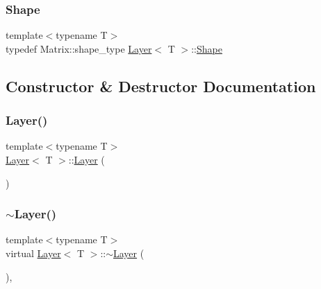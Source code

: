 \mbox{\label{class_layer_a8313f42d2292d12dd5d40cc115636693}} 
\subsubsection{\texorpdfstring{Shape}{Shape}}
{\footnotesize\ttfamily template$<$typename T$>$ \\
typedef Matrix\+::shape\+\_\+type \mbox{\hyperlink{class_layer}{Layer}}$<$ T $>$\+::\mbox{\hyperlink{class_layer_a8313f42d2292d12dd5d40cc115636693}{Shape}}}



\subsection{Constructor \& Destructor Documentation}
\mbox{\label{class_layer_a7db1fc76bec3431efbb0984192e2ae23}} 
\subsubsection{\texorpdfstring{Layer()}{Layer()}}
{\footnotesize\ttfamily template$<$typename T$>$ \\
\mbox{\hyperlink{class_layer}{Layer}}$<$ T $>$\+::\mbox{\hyperlink{class_layer}{Layer}} (\begin{DoxyParamCaption}{ }\end{DoxyParamCaption})\hspace{0.3cm}{\ttfamily [default]}}

\mbox{\label{class_layer_ac2c7d2238eb3d09a2198736c5b10f940}} 
\subsubsection{\texorpdfstring{$\sim$Layer()}{~Layer()}}
{\footnotesize\ttfamily template$<$typename T$>$ \\
virtual \mbox{\hyperlink{class_layer}{Layer}}$<$ T $>$\+::$\sim$\mbox{\hyperlink{class_layer}{Layer}} (\begin{DoxyParamCaption}{ }\end{DoxyParamCaption})\hspace{0.3cm}{\ttfamily [virtual]}, {\ttfamily [default]}}



